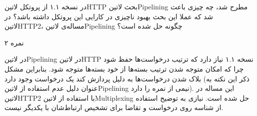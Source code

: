 
در نسخه ۱.۱ از پروتکل ‌لاتین{HTTP} بحث ‌لاتین{Pipelining} مطرح شد، چه چیزی باعث شد که عملا این بحث بهبود ناچیزی در کارایی این پروتکل داشته باشد؟
در ‌لاتین{HTTP2}، مساله‌ی ‌لاتین{Pipelining} چگونه حل شده است؟

۲ نمره


در ‌لاتین{Pipelining} در ‌لاتین{HTTP} نسخه ۱.۱ نیاز دارد که ترتیب درخواست‌ها حفظ شود
چرا که امکان متوجه شدن ترتیب بسته‌ها از خود بسته‌ها متوجه شود.
بنابراین مشکل بلاک شدن درخواست‌ها به دلیل پردازش کند یک درخواست
وجود دارد (ذکر این نکته به عنوان دلیل عدم استفاده از ‌لاتین{Pipelining} نیمی از نمره را دارد). این مساله در ‌لاتین{HTTP2} با استفاده از ‌لاتین{Multiplexing} حل شده است.
نیازی به توضیح استفاده از شناسه روی درخواست و تقاضا برای تشخیص ارتباط‌شان با یکدیگر نیست.

